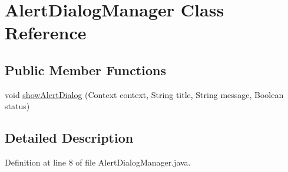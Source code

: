 \hypertarget{classapp_1_1utilities_1_1_alert_dialog_manager}{\section{Alert\-Dialog\-Manager Class Reference}
\label{classapp_1_1utilities_1_1_alert_dialog_manager}
}
\subsection*{Public Member Functions}
\begin{DoxyCompactItemize}
\item 
void \hyperlink{classapp_1_1utilities_1_1_alert_dialog_manager_a41ed5e7e64309a3f3397a4d338f7d5bf}{show\-Alert\-Dialog} (Context context, String title, String message, Boolean status)
\end{DoxyCompactItemize}


\subsection{Detailed Description}


Definition at line 8 of file Alert\-Dialog\-Manager.\-java.



